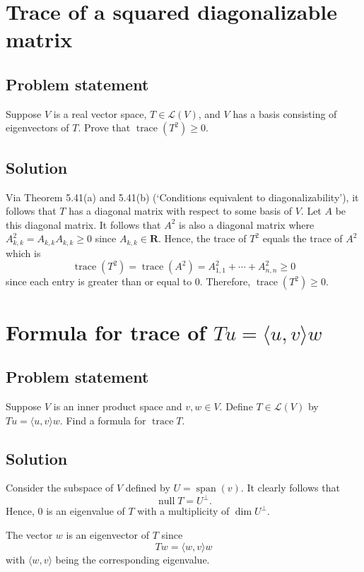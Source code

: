\documentclass{article}
\begin{document}
\clearpage

\section{Trace of a squared diagonalizable matrix}
\subsection*{Problem statement}
Suppose $V$ is a real vector space, $T\in\mathcal{L}(V)$, and $V$ has a basis consisting of eigenvectors of $T$. 
Prove that $\operatorname{trace}(T^2)\geq 0$.

\subsection*{Solution}
Via Theorem 5.41(a) and 5.41(b) (`Conditions equivalent to diagonalizability'), it follows that $T$ has a diagonal matrix with respect to some basis of $V$. 
Let $A$ be this diagonal matrix. 
It follows that $A^2$ is also a diagonal matrix where $A^2_{k,k}=A_{k,k}A_{k,k}\geq 0$ since $A_{k,k}\in\mathbf{R}$. 
Hence, the trace of $T^2$ equals the trace of $A^2$ which is
\[\operatorname{trace}(T^2)=\operatorname{trace}(A^2)=A^2_{1,1}+\cdots+A^2_{n,n}\geq 0\]
since each entry is greater than or equal to $0$. 
Therefore, $\operatorname{trace}(T^2)\geq 0$.

\clearpage

\section{Formula for trace of $Tu=\langle u,v\rangle w$}
\subsection*{Problem statement}
Suppose $V$ is an inner product space and $v,w\in V$. 
Define $T\in\mathcal{L}(V)$ by $Tu=\langle u,v\rangle w$. 
Find a formula for $\operatorname{trace}T$.

\subsection*{Solution}
Consider the subspace of $V$ defined by $U=\operatorname{span}(v)$. 
It clearly follows that
\[\operatorname{null}T=U^\bot.\]
Hence, $0$ is an eigenvalue of $T$ with a multiplicity of $\operatorname{dim}U^\bot$.

The vector $w$ is an eigenvector of $T$ since
\[Tw=\langle w,v\rangle w\]
with $\langle w,v\rangle$ being the corresponding eigenvalue.
\end{document}
